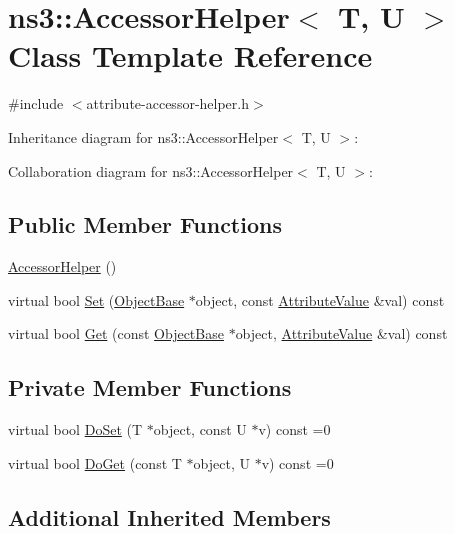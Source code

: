 \hypertarget{classns3_1_1AccessorHelper}{}\section{ns3\+:\+:Accessor\+Helper$<$ T, U $>$ Class Template Reference}
\label{classns3_1_1AccessorHelper}


{\ttfamily \#include $<$attribute-\/accessor-\/helper.\+h$>$}



Inheritance diagram for ns3\+:\+:Accessor\+Helper$<$ T, U $>$\+:


Collaboration diagram for ns3\+:\+:Accessor\+Helper$<$ T, U $>$\+:
\subsection*{Public Member Functions}
\begin{DoxyCompactItemize}
\item 
\hyperlink{classns3_1_1AccessorHelper_a4ceffbc55f890e21436ded492553005e}{Accessor\+Helper} ()
\item 
virtual bool \hyperlink{classns3_1_1AccessorHelper_a5cc2ded11ad68aec37a50abf7b02dcef}{Set} (\hyperlink{classns3_1_1ObjectBase}{Object\+Base} $\ast$object, const \hyperlink{classns3_1_1AttributeValue}{Attribute\+Value} \&val) const 
\item 
virtual bool \hyperlink{classns3_1_1AccessorHelper_adb4dcce92145686cd97c42b77b100a77}{Get} (const \hyperlink{classns3_1_1ObjectBase}{Object\+Base} $\ast$object, \hyperlink{classns3_1_1AttributeValue}{Attribute\+Value} \&val) const 
\end{DoxyCompactItemize}
\subsection*{Private Member Functions}
\begin{DoxyCompactItemize}
\item 
virtual bool \hyperlink{classns3_1_1AccessorHelper_ae7d6639bed616aaf4bb1d88f1d82d5e6}{Do\+Set} (T $\ast$object, const U $\ast$v) const =0
\item 
virtual bool \hyperlink{classns3_1_1AccessorHelper_a872dc9e177b8c048899dde1656ed73e4}{Do\+Get} (const T $\ast$object, U $\ast$v) const =0
\end{DoxyCompactItemize}
\subsection*{Additional Inherited Members}


